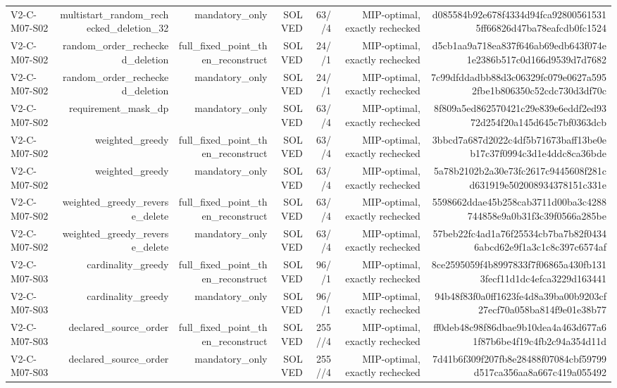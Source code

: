 {\begin{longtable}{lrrrrrr}
V2-C-M07-S02 & multistart\_random\_rechecked\_deletion\_32 & mandatory\_only & SOLVED & 63//4 & MIP-optimal, exactly rechecked & d085584b92e678f4334d94fca928005615315ff66826d47ba78eafcdb0fc1524 \\
V2-C-M07-S02 & random\_order\_rechecked\_deletion & full\_fixed\_point\_then\_reconstruct & SOLVED & 24//1 & MIP-optimal, exactly rechecked & d5cb1aa9a718ea837f646ab69edb643f074e1e2386b517c0d166d9539d7d7682 \\
V2-C-M07-S02 & random\_order\_rechecked\_deletion & mandatory\_only & SOLVED & 24//1 & MIP-optimal, exactly rechecked & 7c99dfddadbb88d3c06329fc079e0627a5952fbe1b806350c52cdc730d3df70c \\
V2-C-M07-S02 & requirement\_mask\_dp & mandatory\_only & SOLVED & 63//4 & MIP-optimal, exactly rechecked & 8f809a5ed862570421c29e839e6eddf2ed9372d254f20a145d645c7bf0363dcb \\
V2-C-M07-S02 & weighted\_greedy & full\_fixed\_point\_then\_reconstruct & SOLVED & 63//4 & MIP-optimal, exactly rechecked & 3bbcd7a687d2022c4df5b71673baff13be0eb17c37f0994c3d1e4ddc8ca36bde \\
V2-C-M07-S02 & weighted\_greedy & mandatory\_only & SOLVED & 63//4 & MIP-optimal, exactly rechecked & 5a78b2102b2a30e73fc2617c9445608f281cd631919e502008934378151c331e \\
V2-C-M07-S02 & weighted\_greedy\_reverse\_delete & full\_fixed\_point\_then\_reconstruct & SOLVED & 63//4 & MIP-optimal, exactly rechecked & 5598662ddae45b258cab3711d00ba3c4288744858e9a0b31f3c39f0566a285be \\
V2-C-M07-S02 & weighted\_greedy\_reverse\_delete & mandatory\_only & SOLVED & 63//4 & MIP-optimal, exactly rechecked & 57beb22fc4ad1a76f25534cb7ba7b82f04346abcd62e9f1a3c1c8c397c6574af \\
V2-C-M07-S03 & cardinality\_greedy & full\_fixed\_point\_then\_reconstruct & SOLVED & 96//1 & MIP-optimal, exactly rechecked & 8ce2595059f4b8997833f7f06865a430fb1313fecf11d1dc4efca3229d163441 \\
V2-C-M07-S03 & cardinality\_greedy & mandatory\_only & SOLVED & 96//1 & MIP-optimal, exactly rechecked & 94b48f83f0a0ff1623fe4d8a39ba00b9203cf27ecf70a058ba814f9e01e38b77 \\
V2-C-M07-S03 & declared\_source\_order & full\_fixed\_point\_then\_reconstruct & SOLVED & 255//4 & MIP-optimal, exactly rechecked & ff0deb48c98f86dbae9b10dea4a463d677a61f87b6be4f19c4fb2c94a354d11d \\
V2-C-M07-S03 & declared\_source\_order & mandatory\_only & SOLVED & 255//4 & MIP-optimal, exactly rechecked & 7d41b6f309f207fb8e28488f07084cbf59799d517ca356aa8a667c419a055492 \\

\end{longtable}}
